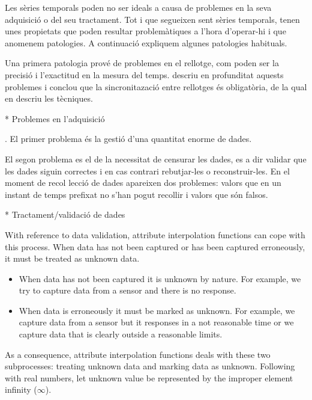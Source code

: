 Les sèries temporals poden no ser ideals a causa de problemes en la
seva adquisició o del seu tractament. Tot i que segueixen sent sèries
temporals, tenen unes propietats que poden resultar problemàtiques a
l'hora d'operar-hi i que anomenem patologies. A continuació expliquem
algunes patologies habituals.







Una primera patologia prové de problemes en el rellotge, com poden ser
la precisió i l'exactitud en la mesura del
temps. \textcite[cap.~3]{kopetz11:realtime} descriu en profunditat
aquests problemes i conclou que la sincronitazació entre rellotges és
obligatòria, de la qual en descriu les tècniques.




* Problemes en l'adquisició







. El primer problema  és la gestió d’una quantitat enorme de dades.




El segon problema  es el de la necessitat de censurar les dades,  es a dir validar que les dades
siguin correctes i en cas contrari rebutjar-les o reconstruir-les.
En el moment  de recol lecció de dades apareixen dos problemes: valors que en un instant de temps prefixat no s'han pogut recollir i valors que són falsos.



* Tractament/validació de dades

With reference to data validation, attribute interpolation functions
can cope with this process. When data has not been captured or has
been captured erroneously, it must be treated as unknown data.
\begin{itemize}
\item When data has not been captured it is unknown by nature. For
  example, we try to capture data from a sensor and there is no
  response.
\item When data is erroneously it must be marked as unknown. For
  example, we capture data from a sensor but it responses in a not
  reasonable time or we capture data that is clearly outside a
  reasonable limits.
\end{itemize}
As a consequence, attribute interpolation functions deals with these
two subprocesses: treating unknown data and marking data as
unknown. Following with real numbers, let unknown value be represented
by the improper element infinity ($\infty$).  

